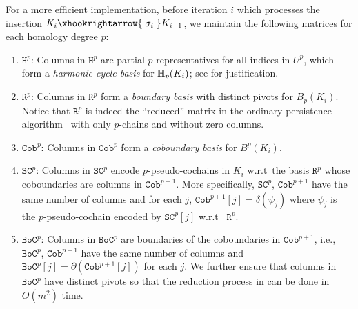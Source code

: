\documentclass[10pt,a4paper]{amsart}
\newcommand {\mm}[1] {\ifmmode{#1}\else{\mbox{\(#1\)}}\fi}
\newcommand{\har}           {\mm{\mathbb{H}}}
\theoremstyle{definition}
\newcommand{\red}{\color{red}}
\newcommand{\filt}{F}
\newcommand{\filtcnt}{m}
\newcommand{\fsimp}{\sigma}
\newcommand{\lbarrowspace}{\;}
\newcommand{\incto}{\hookrightarrow}
\newcommand{\inctosp}[1]{\xhookrightarrow{\lbarrowspace#1\lbarrowspace}}
\newcommand{\Zyc}{Z}
\newcommand{\Bnd}{B}
\newcommand{\Cobmat}{\mathtt{Cob}}
\newcommand{\Chnmat}{\mathtt{SC}}
\newcommand{\Bndmat}{\mathtt{BoC}}
\newcommand{\Harmat}{\mathtt{H}}
\newcommand{\Rmat}{\mathtt{R}}
\newcommand{\dG}{\delta}
\theoremstyle{remark}
\begin{document}
For a more efficient implementation,
before  iteration $i$ which processes the insertion 
$K_{i}\inctosp{\fsimp_i} K_{i+1}$,
we maintain the following matrices
for each homology degree $p$:
\begin{enumerate}

    \item $\Harmat^{p}$: Columns in  $\Harmat^{p}$
    are
    partial $p$-representatives 
    for all indices in $U^p$,
 which
 form a \emph{harmonic cycle basis} for $\har_p(K_i)$;
 see  for justification.

\item $\Rmat^p$: Columns in $\Rmat^p$ form a \emph{boundary basis} with distinct pivots for $\Bnd_p(K_i)$.
Notice that $\Rmat^p$ is indeed the ``reduced'' matrix 
in the
ordinary persistence algorithm~\cite{cohen2006vines}
with only $p$-chains
and without zero columns.

\item $\Cobmat^p$: Columns in $\Cobmat^p$ form a \emph{coboundary basis}
for $\Bnd^p(K_i)$.


\item 
$\Chnmat^p$: Columns in $\Chnmat^p$
encode $p$-pseudo-cochains in $K_i$ w.r.t\ the basis $\Rmat^p$
whose coboundaries are columns in
$\Cobmat^{p+1}$.
More specifically,
$\Chnmat^p$, $\Cobmat^{p+1}$ have the same number of columns
and for each $j$,
$\Cobmat^{p+1}[j]=\dG(\psi_j)$ 
where $\psi_j$ is the $p$-pseudo-cochain
encoded by $\Chnmat^p[j]$
w.r.t\ 
$\Rmat^p$.

\item $\Bndmat^p$: Columns in $\Bndmat^p$ are boundaries of the
coboundaries in $\Cobmat^{p+1}$,
i.e., 
 $\Bndmat^p$, $\Cobmat^{p+1}$
have the same number of columns and
$\Bndmat^p[j]=\partial(\Cobmat^{p+1}[j])$ for each $j$.
We further ensure that columns in $\Bndmat^p$ have distinct pivots
so that the reduction process in \Cref{algr:reduce} 
can be done in $O(\filtcnt^2)$ time.
\end{enumerate}
\end{document}
